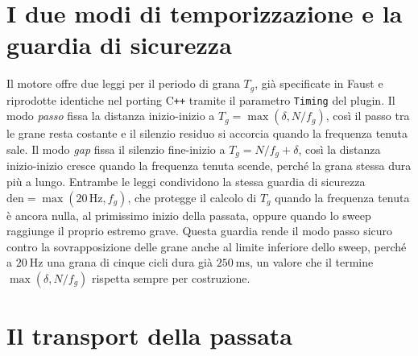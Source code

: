 \documentclass[11pt,a4paper]{article}
\begin{document}
\section{I due modi di temporizzazione e la guardia di sicurezza}\label{sec:timing}

Il motore offre due leggi per il periodo di grana $T_g$, gi\`a specificate in Faust e riprodotte identiche nel porting C\texttt{++} tramite il parametro \texttt{Timing} del plugin.
Il modo \emph{passo} fissa la distanza inizio-inizio a $T_g = \max(\delta, N/f_g)$, cos\`i il passo tra le grane resta costante e il silenzio residuo si accorcia quando la frequenza tenuta sale.
Il modo \emph{gap} fissa il silenzio fine-inizio a $T_g = N/f_g + \delta$, cos\`i la distanza inizio-inizio cresce quando la frequenza tenuta scende, perch\'e la grana stessa dura pi\`u a lungo.
Entrambe le leggi condividono la stessa guardia di sicurezza $\mathrm{den} = \max(20\,\mathrm{Hz}, f_g)$, che protegge il calcolo di $T_g$ quando la frequenza tenuta \`e ancora nulla, al primissimo inizio della passata, oppure quando lo sweep raggiunge il proprio estremo grave.
Questa guardia rende il modo passo sicuro contro la sovrapposizione delle grane anche al limite inferiore dello sweep, perch\'e a $\SI{20}{\hertz}$ una grana di cinque cicli dura gi\`a $\SI{250}{\milli\second}$, un valore che il termine $\max(\delta, N/f_g)$ rispetta sempre per costruzione.

\section{Il transport della passata}\label{sec:transport}
\end{document}
